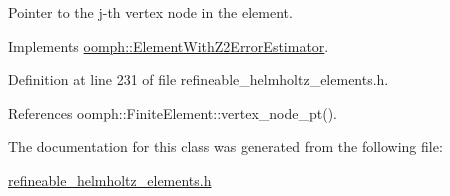 Pointer to the j-\/th vertex node in the element. 



Implements \hyperlink{classoomph_1_1ElementWithZ2ErrorEstimator_a0eedccc33519f852c5dc2055ddf2774b}{oomph\+::\+Element\+With\+Z2\+Error\+Estimator}.



Definition at line 231 of file refineable\+\_\+helmholtz\+\_\+elements.\+h.



References oomph\+::\+Finite\+Element\+::vertex\+\_\+node\+\_\+pt().



The documentation for this class was generated from the following file\+:\begin{DoxyCompactItemize}
\item 
\hyperlink{refineable__helmholtz__elements_8h}{refineable\+\_\+helmholtz\+\_\+elements.\+h}\end{DoxyCompactItemize}
